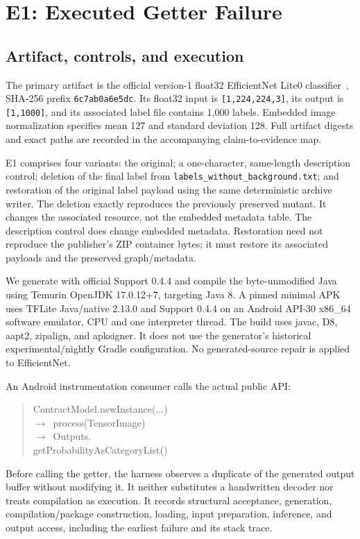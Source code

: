 \documentclass[10pt,twocolumn,letterpaper]{article}
\newcommand{\code}[1]{\texttt{#1}}
\begin{document}
\section{E1: Executed Getter Failure}
\label{sec:e1}
\subsection{Artifact, controls, and execution}
The primary artifact is the official version-1 float32 EfficientNet Lite0 classifier~\cite{efficientnet}, SHA-256 prefix \code{6c7ab0a6e5dc}. Its float32 input is \code{[1,224,224,3]}, its output is \code{[1,1000]}, and its associated label file contains 1,000 labels. Embedded image normalization specifies mean 127 and standard deviation 128. Full artifact digests and exact paths are recorded in the accompanying claim-to-evidence map.

E1 comprises four variants: the original; a one-character, same-length description control; deletion of the final label from \code{labels\_without\_background.txt}; and restoration of the original label payload using the same deterministic archive writer. The deletion exactly reproduces the previously preserved mutant. It changes the associated resource, not the embedded metadata table. The description control does change embedded metadata. Restoration need not reproduce the publisher's ZIP container bytes; it must restore its associated payloads and the preserved graph/metadata.

We generate with official Support 0.4.4 and compile the byte-unmodified Java using Temurin OpenJDK 17.0.12+7, targeting Java 8. A pinned minimal APK uses TFLite Java/native 2.13.0 and Support 0.4.4 on an Android API-30 x86\_64 software emulator, CPU and one interpreter thread. The build uses javac, D8, aapt2, zipalign, and apksigner. It does not use the generator's historical experimental/nightly Gradle configuration. No generated-source repair is applied to EfficientNet.

An Android instrumentation consumer calls the actual public API:
\begin{quote}\small\ttfamily\raggedright
ContractModel.newInstance(...)\\
\quad\(\rightarrow\)\ process(TensorImage)\\
\quad\(\rightarrow\)\ Outputs.\\
\hspace*{1.4em}getProbabilityAsCategoryList()
\end{quote}
Before calling the getter, the harness observes a duplicate of the generated output buffer without modifying it. It neither substitutes a handwritten decoder nor treats compilation as execution. It records structural acceptance, generation, compilation/package construction, loading, input preparation, inference, and output access, including the earliest failure and its stack trace.
\end{document}
